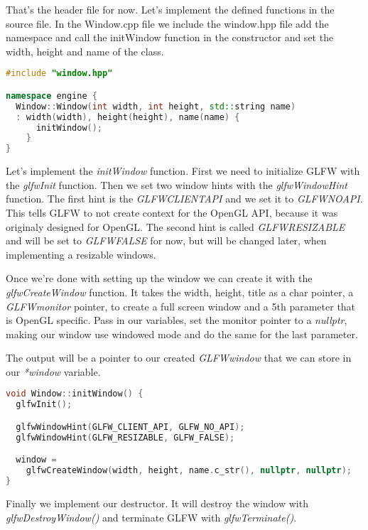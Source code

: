 \documentclass[12pt]{report} \usepackage{preamble}
\begin{document}
That's the header file for now. Let's implement the defined functions in the source file.
In the Window.cpp file we include the window.hpp file add the namespace and
call the initWindow function in the constructor and set the width, height and name of the class.

\begin{lstlisting}[language=C++]
#include "window.hpp"

namespace engine {
  Window::Window(int width, int height, std::string name)
  : width(width), height(height), name(name) {
      initWindow();
    }
}
\end{lstlisting}

Let's implement the \textit{initWindow} function. First we need to initialize GLFW with the
\textit{glfwInit} function. Then we set two window hints with the \textit{glfwWindowHint} function.
The first hint is the \textit{GLFW\textunderscore CLIENT\textunderscore API} and we set it to
\textit{GLFW\textunderscore NO\textunderscore API}. This tells
GLFW to not create context for the OpenGL API, because it was originaly designed for OpenGL. \cite{client-api-hint}
The second hint is called \textit{GLFW\textunderscore RESIZABLE} and will be set to \textit{GLFW\textunderscore FALSE}
for now, but will be changed later, when implementing a resizable windows.

Once we're done with setting up the window we can create it with the \textit{glfwCreateWindow} function.
It takes the width, height, title as a char pointer, a \textit{GLFWmonitor} pointer, to create a full screen
window and a 5th parameter that is OpenGL specific. Pass in our variables, set the monitor pointer to a
\textit{nullptr}, making our window use windowed mode and do the same for the last parameter.

The output will be a pointer to our created \textit{GLFWwindow} that we can store in our \textit{*window}
variable.

\begin{lstlisting}[language=C++] 
void Window::initWindow() {
  glfwInit();

  glfwWindowHint(GLFW_CLIENT_API, GLFW_NO_API);
  glfwWindowHint(GLFW_RESIZABLE, GLFW_FALSE);

  window = 
    glfwCreateWindow(width, height, name.c_str(), nullptr, nullptr);
}
\end{lstlisting}

Finally we implement our destructor. It will destroy the window with \textit{glfwDestroyWindow()}
and terminate GLFW with \textit{glfwTerminate()}.
\end{document}
